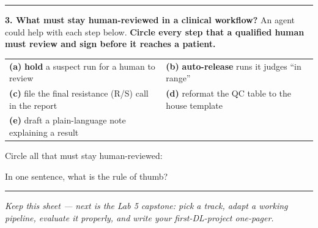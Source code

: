 \documentclass[11pt]{article}
\newif\ifsolution
\newcommand{\blk}[1]{\underline{\hspace{#1}}}
\newcommand{\rb}[2]{\ifsolution\textbf{#1}\else\blk{#2}\fi}
\newcommand{\keybox}[1]{\ifsolution\par\vspace{2pt}%
  \fbox{\parbox{0.965\textwidth}{\small\textbf{Answer.}\; #1}}\par\fi}
\newcommand{\work}[1]{\ifsolution\else\vspace{#1}\fi}
\begin{document}
\vspace{2pt}\hrule\vspace{5pt}

\textbf{3. What must stay human-reviewed in a clinical workflow?}\; {\small An agent could help with each
step below. \textbf{Circle every step that a qualified human must review and sign before it reaches a
patient.}}

\vspace{4pt}
\begin{center}
\renewcommand{\arraystretch}{1.3}
\begin{tabular}{@{}ll@{}}
\textbf{(a)} \textbf{hold} a suspect run for a human to review &
\textbf{(b)} \textbf{auto-release} runs it judges ``in range'' \\
\textbf{(c)} file the final resistance (R/S) call in the report &
\textbf{(d)} reformat the QC table to the house template \\
\textbf{(e)} draft a plain-language note explaining a result & \\
\end{tabular}
\end{center}

\vspace{3pt}
Circle all that must stay human-reviewed:\; \rb{(b) and (c)}{5.5cm}

\vspace{3pt}
In one sentence, what is the rule of thumb?

\work{1.0cm}
\ifsolution\else\blk{\linewidth}\fi

\keybox{\textbf{(b) and (c)} must stay human-reviewed and signed. (b) auto-\emph{releasing} a result and
(c) the final resistance (R/S) call each become a \emph{released clinical result} or a
\emph{patient-affecting decision}, so a qualified person must verify and sign. Note the near-miss with (a):
\textbf{holding / flagging} a suspect run for review is \emph{conservative} --- it only routes work to a
human and releases nothing --- so an agent may do it freely, unlike auto-releasing in (b). Steps (d)
reformatting tables and (e) drafting an explanatory note are agent-friendly helpers (still spot-checked and
logged), because they don't release a result or decide anything about a patient. \textbf{Rule of thumb:}
anything that \emph{releases a result} or makes a \emph{patient-affecting decision} needs the human gate
--- flagging, drafting, and reformatting do not.}

\vspace{4pt}\hrule\vspace{3pt}
{\small\itshape \ifsolution Answer key.\else Keep this sheet --- next is the Lab 5 capstone: pick a track,
adapt a working pipeline, evaluate it properly, and write your first-DL-project one-pager.\fi}
\end{document}
